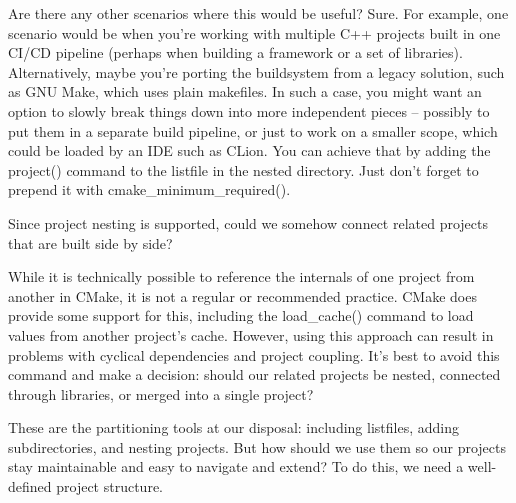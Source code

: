 Are there any other scenarios where this would be useful? Sure. For example, one scenario would be when you’re working with multiple C++ projects built in one CI/CD pipeline (perhaps when building a framework or a set of libraries). Alternatively, maybe you’re porting the buildsystem from a legacy solution, such as GNU Make, which uses plain makefiles. In such a case, you might want an option to slowly break things down into more independent pieces – possibly to put them in a separate build pipeline, or just to work on a smaller scope, which could be loaded by an IDE such as CLion. You can achieve that by adding the project() command to the listfile in the nested directory. Just don’t forget to prepend it with cmake\_minimum\_required().

Since project nesting is supported, could we somehow connect related projects that are built side by side?


While it is technically possible to reference the internals of one project from another in CMake, it is not a regular or recommended practice. CMake does provide some support for this, including the load\_cache() command to load values from another project’s cache. However, using this approach can result in problems with cyclical dependencies and project coupling. It’s best to avoid this command and make a decision: should our related projects be nested, connected through libraries, or merged into a single project?

These are the partitioning tools at our disposal: including listfiles, adding subdirectories, and nesting projects. But how should we use them so our projects stay maintainable and easy to navigate and extend? To do this, we need a well-defined project structure.




















